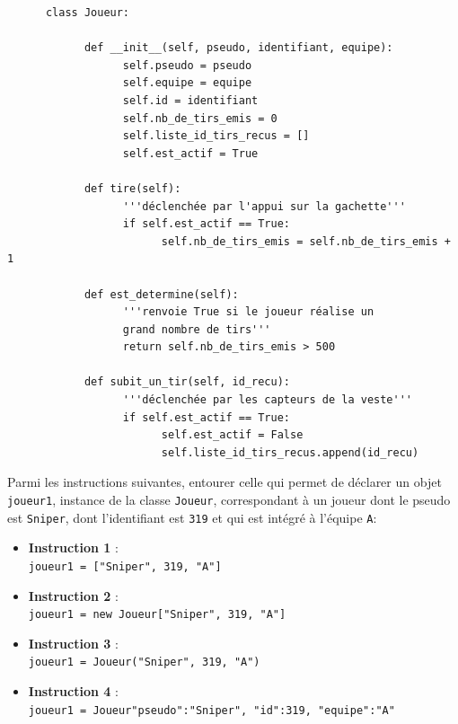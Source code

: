 \documentclass[a4paper,12pt,eval,firamath]{nsi}
\begin{document}
\begin{pyc}
\begin{verbatim}
      class Joueur:
            
            def __init__(self, pseudo, identifiant, equipe):
                  self.pseudo = pseudo
                  self.equipe = equipe
                  self.id = identifiant
                  self.nb_de_tirs_emis = 0
                  self.liste_id_tirs_recus = []
                  self.est_actif = True
            
            def tire(self):
                  '''déclenchée par l'appui sur la gachette'''
                  if self.est_actif == True:
                        self.nb_de_tirs_emis = self.nb_de_tirs_emis + 1
            
            def est_determine(self):
                  '''renvoie True si le joueur réalise un
                  grand nombre de tirs'''
                  return self.nb_de_tirs_emis > 500
            
            def subit_un_tir(self, id_recu):
                  '''déclenchée par les capteurs de la veste'''
                  if self.est_actif == True:
                        self.est_actif = False
                        self.liste_id_tirs_recus.append(id_recu)            
\end{verbatim}
\end{pyc}
\question Parmi les instructions suivantes, entourer celle qui permet de déclarer un objet
\texttt{joueur1}, instance de la classe \texttt{Joueur}, correspondant à un joueur dont le pseudo est \texttt{Sniper}, dont l'identifiant est \texttt{319} et qui est intégré à l'équipe \texttt{A}:
\begin{itemize}
      \item \textbf{Instruction 1} :\\ \texttt{joueur1 = ["Sniper", 319, "A"]}
      \item \textbf{Instruction 2} :\\ \texttt{joueur1 = new Joueur["Sniper", 319, "A"]}
      \item \textbf{Instruction 3} :\\ \texttt{joueur1 = Joueur("Sniper", 319, "A")}
      \item \textbf{Instruction 4} :\\ \texttt{joueur1 = Joueur{"pseudo":"Sniper", "id":319, "equipe":"A"}}
\end{itemize}
\end{document}
